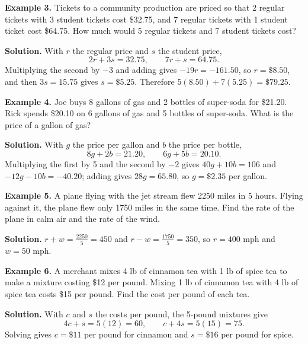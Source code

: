 \documentclass{ximera}
\begin{document}
\begin{problem}

\textbf{Example 3.} Tickets to a community production are priced so that 2 regular
tickets with 3 student tickets cost \$32.75, and 7 regular tickets with 1 student ticket
cost \$64.75. How much would 5 regular tickets and 7 student tickets cost?

\begin{hint}
\textbf{Solution.} With $r$ the regular price and $s$ the student price,
\[
  2r+3s=32.75, \qquad 7r+s=64.75 .
\]
Multiplying the second by $-3$ and adding gives $-19r=-161.50$, so $r=\$8.50$, and then
$3s=15.75$ gives $s=\$5.25$. Therefore
$5(8.50)+7(5.25)=\$79.25$.
\end{hint}
\end{problem}

\begin{problem}

\textbf{Example 4.} Joe buys 8 gallons of gas and 2 bottles of super-soda for \$21.20.
Rick spends \$20.10 on 6 gallons of gas and 5 bottles of super-soda. What is the price of
a gallon of gas?

\begin{hint}
\textbf{Solution.} With $g$ the price per gallon and $b$ the price per bottle,
\[
  8g+2b=21.20, \qquad 6g+5b=20.10 .
\]
Multiplying the first by 5 and the second by $-2$ gives $40g+10b=106$ and
$-12g-10b=-40.20$; adding gives $28g=65.80$, so $g=\$2.35$ per gallon.
\end{hint}
\end{problem}

\begin{problem}

\textbf{Example 5.} A plane flying with the jet stream flew 2250 miles in 5 hours.
Flying against it, the plane flew only 1750 miles in the same time. Find the rate of the
plane in calm air and the rate of the wind.

\begin{hint}
\textbf{Solution.} $r+w=\tfrac{2250}{5}=450$ and $r-w=\tfrac{1750}{5}=350$, so $r=400$
mph and $w=50$ mph.
\end{hint}
\end{problem}

\begin{problem}

\textbf{Example 6.} A merchant mixes 4 lb of cinnamon tea with 1 lb of spice tea to make
a mixture costing \$12 per pound. Mixing 1 lb of cinnamon tea with 4 lb of spice tea
costs \$15 per pound. Find the cost per pound of each tea.

\begin{hint}
\textbf{Solution.} With $c$ and $s$ the costs per pound, the 5-pound mixtures give
\[
  4c+s=5(12)=60, \qquad c+4s=5(15)=75 .
\]
Solving gives $c=\$11$ per pound for cinnamon and $s=\$16$ per pound for spice.
\end{hint}
\end{problem}
\end{document}
